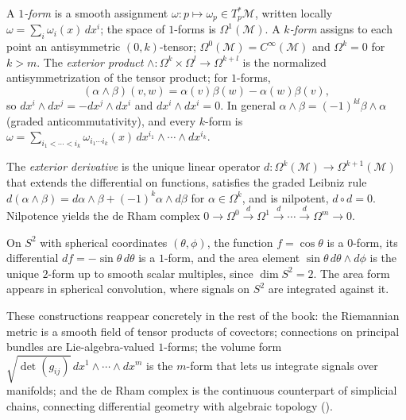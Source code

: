 \begin{definition}
\label{def:found:forms}
A \emph{$1$-form} is a smooth assignment $\omega : p \mapsto \omega_p \in
T_p^*\mathcal{M}$, written locally $\omega = \sum_i \omega_i(x)\, dx^i$; the space
of $1$-forms is $\Omega^1(\mathcal{M})$. A \emph{$k$-form} assigns to each point
an antisymmetric $(0,k)$-tensor; $\Omega^0(\mathcal{M}) = C^\infty(\mathcal{M})$
and $\Omega^k = 0$ for $k > m$. The \emph{exterior product} $\wedge :
\Omega^k \times \Omega^l \to \Omega^{k+l}$ is the normalized antisymmetrization
of the tensor product; for $1$-forms,
\[
  (\alpha \wedge \beta)(v, w) = \alpha(v)\beta(w) - \alpha(w)\beta(v),
\]
so $dx^i \wedge dx^j = -dx^j \wedge dx^i$ and $dx^i \wedge dx^i = 0$. In general
$\alpha \wedge \beta = (-1)^{kl}\beta \wedge \alpha$ (graded
anticommutativity), and every $k$-form is $\omega = \sum_{i_1 < \cdots < i_k}
\omega_{i_1\cdots i_k}(x)\, dx^{i_1} \wedge \cdots \wedge dx^{i_k}$.
\end{definition}

\begin{definition}
\label{def:found:exterior-deriv}
The \emph{exterior derivative} is the unique linear operator
$d : \Omega^k(\mathcal{M}) \to \Omega^{k+1}(\mathcal{M})$ that extends the
differential on functions, satisfies the graded Leibniz rule $d(\alpha \wedge
\beta) = d\alpha \wedge \beta + (-1)^k \alpha \wedge d\beta$ for $\alpha \in
\Omega^k$, and is nilpotent, $d \circ d = 0$. Nilpotence yields the de Rham
complex $0 \to \Omega^0 \xrightarrow{d} \Omega^1 \xrightarrow{d} \cdots
\xrightarrow{d} \Omega^m \to 0$.
\end{definition}

\begin{example}
\label{ex:found:forms-sphere}
On $S^2$ with spherical coordinates $(\theta, \phi)$, the function
$f = \cos\theta$ is a $0$-form, its differential $df = -\sin\theta\, d\theta$ is a
$1$-form, and the area element $\sin\theta\, d\theta \wedge d\phi$ is the unique
$2$-form up to smooth scalar multiples, since $\dim S^2 = 2$. The area form
appears in spherical convolution, where signals on $S^2$ are integrated against
it.
\end{example}

These constructions reappear concretely in the rest of the book: the Riemannian
metric is a smooth field of tensor products of covectors; connections on
principal bundles are Lie-algebra-valued $1$-forms; the volume form
$\sqrt{\det(g_{ij})}\, dx^1 \wedge \cdots \wedge dx^m$ is the $m$-form that lets
us integrate signals over manifolds; and the de Rham complex is the continuous
counterpart of simplicial chains, connecting differential geometry with algebraic
topology ().

